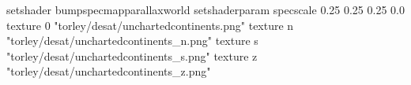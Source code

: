setshader bumpspecmapparallaxworld
setshaderparam specscale 0.25 0.25 0.25 0.0
texture 0 "torley/desat/unchartedcontinents.png"
texture n "torley/desat/unchartedcontinents_n.png"
texture s "torley/desat/unchartedcontinents_s.png"
texture z "torley/desat/unchartedcontinents_z.png"

